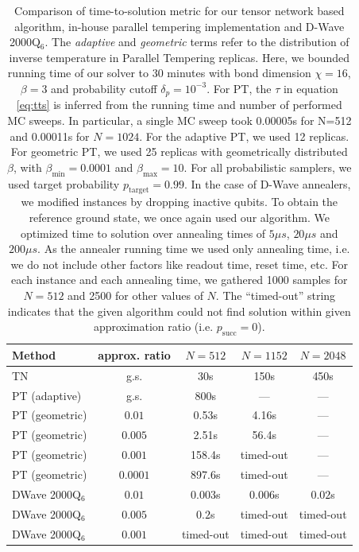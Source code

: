 \begin{table}[b]
  \centering
  \begin{tabular}{|l|c|ccc|}
    \hline
    \rowcolor{theader}  Method & approx. ratio & $N=512$   & $N=1152$  & $N=2048$  \\
    \hline
    TN                         & g.s.          & 30s       & 150s      & 450s      \\
    \hline
    \hline
    PT (adaptive)              & g.s.          & 800s      & ---       & ---       \\
    \hline
    PT (geometric)             & $0.01$        & 0.53s     & 4.16s     & ---       \\
    PT (geometric)             & $0.005$       & 2.51s     & 56.4s     & ---       \\
    PT (geometric)             & $0.001$       & 158.4s    & timed-out & ---       \\
    PT (geometric)             & $0.0001$      & 897.6s    & timed-out & ---       \\
    \hline
    \hline
    DWave 2000Q$_6$            & $0.01$        & $0.003$s  & $0.006$s  & $0.02$s   \\
    DWave 2000Q$_6$            & $0.005$       & $0.2$s    & timed-out & timed-out \\
    DWave 2000Q$_6$            & $0.001$       & timed-out & timed-out & timed-out \\
    \hline
    \hline
  \end{tabular}
  \caption{Comparison of time-to-solution metric for our tensor network based algorithm,
    in-house parallel tempering implementation and D-Wave 2000Q$_{6}$. The
    \emph{adaptive} and \emph{geometric} terms refer to the distribution of inverse
    temperature in Parallel Tempering replicas. Here, we bounded running time of
    our solver to 30 minutes with bond dimension $\chi = 16$, $\beta=3$ and
    probability cutoff $\delta_{p} = 10^{-3}$. For PT, the $\tau$ in equation
    \ref{eq:tts} is inferred from the running time and number of performed MC
    sweeps. In particular, a single MC sweep took 0.00005s for N=512 and 0.00011s
    for $N=1024$. For the adaptive PT, we used 12 replicas. For geometric PT, we
    used 25 replicas with geometrically distributed $\beta$, with
    $\beta_{\min}=0.0001$ and $\beta_{\max}=10$. For all probabilistic samplers, we
    used target probability $p_{\mbox{target}}=0.99$. In the case of D-Wave
    annealers, we modified instances by dropping inactive qubits. To obtain the
    reference ground state, we once again used our algorithm. We optimized time to
    solution over annealing times of $5\mu s$, $20\mu s$ and $200\mu s$. As the
    annealer running time we used only annealing time, i.e. we do not include other
    factors like readout time, reset time, etc. For each instance and each
    annealing time, we gathered 1000 samples for $N=512$ and 2500 for other values
    of $N$. The ``timed-out'' string indicates that the given algorithm could not
    find solution within given approximation ratio (i.e. $p_{\mbox{succ}}=0$). }
  \label{tab:tnvspt}
\end{table}

